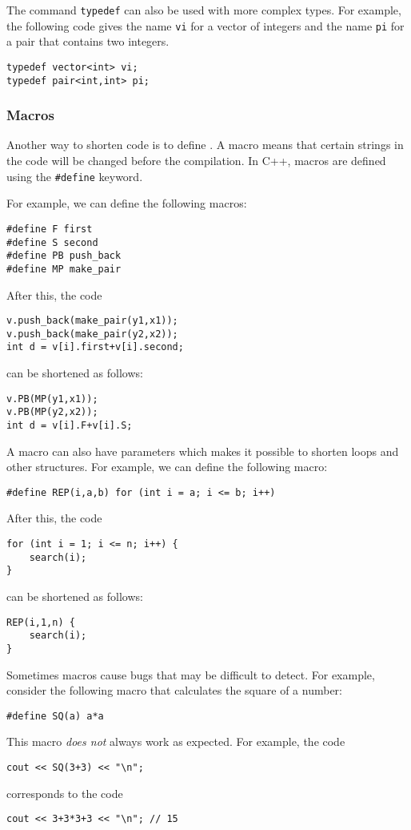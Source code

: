 The command \texttt{typedef}
can also be used with more complex types.
For example, the following code gives
the name \texttt{vi} for a vector of integers
and the name \texttt{pi} for a pair
that contains two integers.
\begin{lstlisting}
typedef vector<int> vi;
typedef pair<int,int> pi;
\end{lstlisting}

\subsubsection{Macros}
Another way to shorten code is to define
.
A macro means that certain strings in
the code will be changed before the compilation.
In C++, macros are defined using the
\texttt{\#define} keyword.

For example, we can define the following macros:
\begin{lstlisting}
#define F first
#define S second
#define PB push_back
#define MP make_pair
\end{lstlisting}
After this, the code
\begin{lstlisting}
v.push_back(make_pair(y1,x1));
v.push_back(make_pair(y2,x2));
int d = v[i].first+v[i].second;
\end{lstlisting}
can be shortened as follows:
\begin{lstlisting}
v.PB(MP(y1,x1));
v.PB(MP(y2,x2));
int d = v[i].F+v[i].S;
\end{lstlisting}

A macro can also have parameters
which makes it possible to shorten loops and other
structures.
For example, we can define the following macro:
\begin{lstlisting}
#define REP(i,a,b) for (int i = a; i <= b; i++)
\end{lstlisting}
After this, the code
\begin{lstlisting}
for (int i = 1; i <= n; i++) {
    search(i);
}
\end{lstlisting}
can be shortened as follows:
\begin{lstlisting}
REP(i,1,n) {
    search(i);
}
\end{lstlisting}

Sometimes macros cause bugs that may be difficult
to detect. For example, consider the following macro
that calculates the square of a number:
\begin{lstlisting}
#define SQ(a) a*a
\end{lstlisting}
This macro \emph{does not} always work as expected.
For example, the code
\begin{lstlisting}
cout << SQ(3+3) << "\n";
\end{lstlisting}
corresponds to the code
\begin{lstlisting}
cout << 3+3*3+3 << "\n"; // 15
\end{lstlisting}

